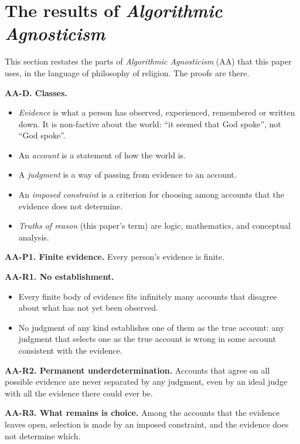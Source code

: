 \section{The results of \emph{Algorithmic Agnosticism}}\label{sec:aa}

This section restates the parts of \emph{Algorithmic Agnosticism} (AA) that this paper uses, in the language of
philosophy of religion. The proofs are there.

\medskip\noindent\textbf{AA-D. Classes.}\label{item:AAD}
\citep[§2]{taylor2026aa}
\begin{itemize}
  \item \emph{Evidence} is what a person has observed, experienced, remembered or written down.
        It is non-factive about the world: ``it seemed that God spoke'', not ``God spoke''.
  \item An \emph{account} is a statement of how the world is.
  \item A \emph{judgment} is a way of passing from evidence to an account.
  \item An \emph{imposed constraint} is a criterion for choosing among accounts that the
        evidence does not determine.
  \item \emph{Truths of reason} (this paper's term) are logic, mathematics, and conceptual
        analysis.
\end{itemize}

\medskip\noindent\textbf{AA-P1. Finite evidence.}\label{item:AAP1}
\citep[§2]{taylor2026aa} Every person's evidence is finite.

\medskip\noindent\textbf{AA-R1. No establishment.}\label{item:AAR1}
\citep[§3]{taylor2026aa}
\begin{itemize}
  \item Every finite body of evidence fits infinitely many accounts that disagree about what has
        not yet been observed.
  \item No judgment of any kind establishes one of them as the true account: any judgment that selects one as
        the true account is wrong in some account consistent with the evidence.
\end{itemize}

\medskip\noindent\textbf{AA-R2. Permanent underdetermination.}\label{item:AAR2}
\citep[§6]{taylor2026aa} Accounts that agree on all possible evidence are never separated by any
judgment, even by an ideal judge with all the evidence there could ever be.

\medskip\noindent\textbf{AA-R3. What remains is choice.}\label{item:AAR3}
\citep[§§4--5, 9]{taylor2026aa} Among the accounts that the evidence leaves open, selection is
made by an imposed constraint, and the evidence does not determine which.
